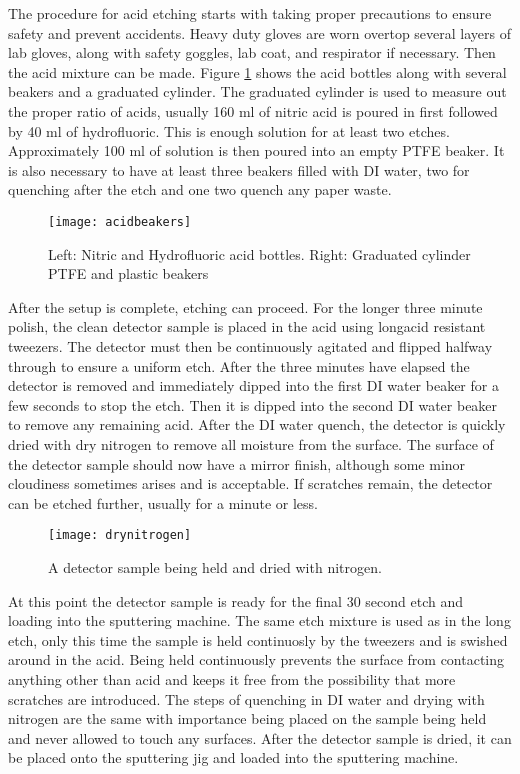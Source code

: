 The procedure for acid etching starts with taking proper precautions to ensure safety and prevent accidents.
Heavy duty gloves are worn overtop several layers of lab gloves, along with safety goggles, lab coat, and respirator if necessary.
Then the acid mixture can be made.
Figure \ref{fig:acidbeakers} shows the acid bottles along with several beakers and a graduated cylinder.
The graduated cylinder is used to measure out the proper ratio of acids, usually 160 ml of nitric acid is poured in first followed by 40 ml of hydrofluoric.
This is enough solution for at least two etches.
Approximately 100 ml of solution is then poured into an empty PTFE beaker.
It is also necessary to have at least three beakers filled with DI water, two for quenching after the etch and one two quench any paper waste.
\begin{figure}[htpb]
\centering
\texttt{[image: acidbeakers]}
\caption{Left: Nitric and Hydrofluoric acid bottles. Right: Graduated cylinder PTFE and plastic beakers}
\label{fig:acidbeakers}
\end{figure}
After the setup is complete, etching can proceed.
For the longer three minute polish, the clean detector sample is placed in the acid using longacid resistant tweezers.
The detector must then be continuously agitated and flipped halfway through to ensure a uniform etch.
After the three minutes have elapsed the detector is removed and immediately dipped into the first DI water beaker for a few seconds to stop the etch.
Then it is dipped into the second DI water beaker to remove any remaining acid.
After the DI water quench, the detector is quickly dried with dry nitrogen to remove all moisture from the surface.
The surface of the detector sample should now have a mirror finish, although some minor cloudiness sometimes arises and is acceptable.
If scratches remain, the detector can be etched further, usually for a minute or less.
\begin{figure}[htpb]
\centering
\texttt{[image: drynitrogen]}
\caption{A detector sample being held and dried with nitrogen.}
\label{fig:drynitrogen}
\end{figure}

At this point the detector sample is ready for the final 30 second etch and loading into the sputtering machine.
The same etch mixture is used as in the long etch, only this time the sample is held continuosly by the tweezers and is swished around in the acid.
Being held continuously prevents the surface from contacting anything other than acid and keeps it free from the possibility that more scratches are introduced.
The steps of quenching in DI water and drying with nitrogen are the same with importance being placed on the sample being held and never allowed to touch any surfaces.
After the detector sample is dried, it can be placed onto the sputtering jig and loaded into the sputtering machine.
